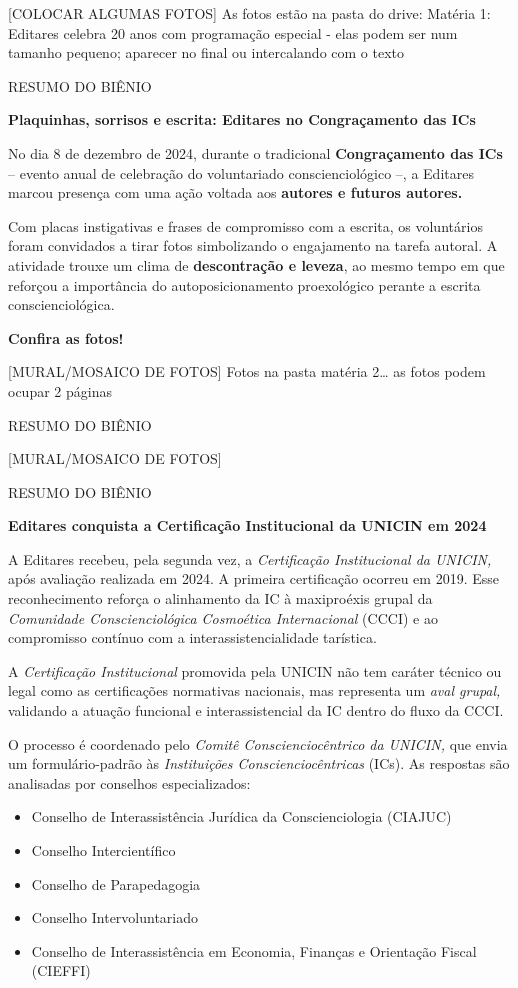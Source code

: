 {[}COLOCAR ALGUMAS FOTOS{]} As fotos estão na pasta do drive: Matéria 1: Editares celebra 20 anos com programação especial - elas podem ser num tamanho pequeno; aparecer no final ou intercalando com o texto

RESUMO DO BIÊNIO

\textbf{Plaquinhas, sorrisos e escrita: Editares no Congraçamento das ICs}

No dia 8 de dezembro de 2024, durante o tradicional \textbf{Congraçamento das ICs} -- evento anual de celebração do voluntariado conscienciológico --, a Editares marcou presença com uma ação voltada aos \textbf{autores e futuros autores.}

Com placas instigativas e frases de compromisso com a escrita, os voluntários foram convidados a tirar fotos simbolizando o engajamento na tarefa autoral. A atividade trouxe um clima de \textbf{descontração e leveza}, ao mesmo tempo em que reforçou a importância do autoposicionamento proexológico perante a escrita conscienciológica.

\textbf{Confira as fotos!}

{[}MURAL/MOSAICO DE FOTOS{]} Fotos na pasta matéria 2\ldots{} as fotos podem ocupar 2 páginas

RESUMO DO BIÊNIO

{[}MURAL/MOSAICO DE FOTOS{]}

RESUMO DO BIÊNIO

\textbf{Editares conquista a Certificação Institucional da UNICIN em 2024}

A Editares recebeu, pela segunda vez, a \emph{Certificação Institucional da UNICIN,} após avaliação realizada em 2024. A primeira certificação ocorreu em 2019. Esse reconhecimento reforça o alinhamento da IC à maxiproéxis grupal da \emph{Comunidade Conscienciológica Cosmoética Internacional} (CCCI) e ao compromisso contínuo com a interassistencialidade tarística.

A \emph{Certificação Institucional} promovida pela UNICIN não tem caráter técnico ou legal como as certificações normativas nacionais, mas representa um \emph{aval grupal,} validando a atuação funcional e interassistencial da IC dentro do fluxo da CCCI.

O processo é coordenado pelo \emph{Comitê Conscienciocêntrico da UNICIN,} que envia um formulário-padrão às \emph{Instituições Conscienciocêntricas} (ICs). As respostas são analisadas por conselhos especializados:

\begin{itemize}
\item
  Conselho de Interassistência Jurídica da Conscienciologia (CIAJUC)
\item
  Conselho Intercientífico
\item
  Conselho de Parapedagogia
\item
  Conselho Intervoluntariado
\item
  Conselho de Interassistência em Economia, Finanças e Orientação Fiscal (CIEFFI)
\end{itemize}

